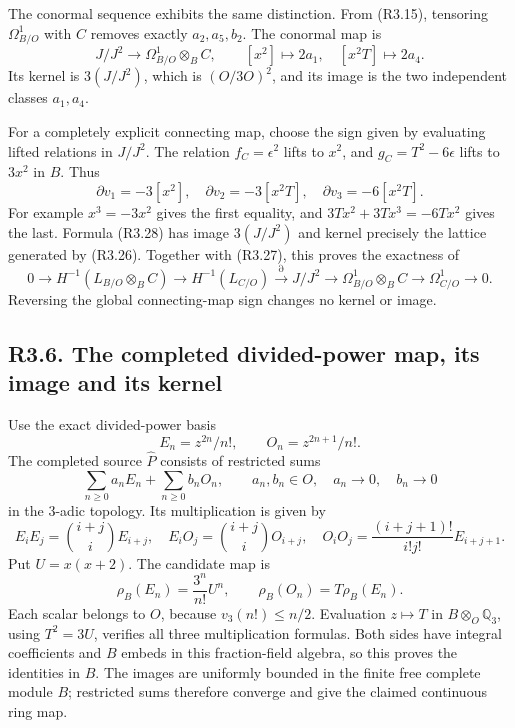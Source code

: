 \documentclass[
]{article}
\begin{document}
The conormal sequence exhibits the same distinction. From (R3.15),
tensoring \(\Omega^1_{B/O}\) with \(C\) removes exactly \(a_2,a_5,b_2\).
The conormal map is \[
J/J^2\longrightarrow\Omega^1_{B/O}\otimes_B C,\qquad
[x^2]\longmapsto2a_1,\quad[x^2T]\longmapsto2a_4.
\tag{R3.27}
\] Its kernel is \(3(J/J^2)\), which is \((O/3O)^2\), and its image is
the two independent classes \(a_1,a_4\).

For a completely explicit connecting map, choose the sign given by
evaluating lifted relations in \(J/J^2\). The relation
\(f_C=\epsilon^2\) lifts to \(x^2\), and \(g_C=T^2-6\epsilon\) lifts to
\(3x^2\) in \(B\). Thus \[
\partial v_1=-3[x^2],\quad
\partial v_2=-3[x^2T],\quad
\partial v_3=-6[x^2T].
\tag{R3.28}
\] For example \(x^3=-3x^2\) gives the first equality, and
\(3Tx^2+3Tx^3=-6Tx^2\) gives the last. Formula (R3.28) has image
\(3(J/J^2)\) and kernel precisely the lattice generated by (R3.26).
Together with (R3.27), this proves the exactness of \[
0\longrightarrow H^{-1}(L_{B/O}\otimes_B C)
\longrightarrow H^{-1}(L_{C/O})
\xrightarrow{\partial}J/J^2
\longrightarrow\Omega^1_{B/O}\otimes_B C
\longrightarrow\Omega^1_{C/O}\longrightarrow0.
\tag{R3.29}
\] Reversing the global connecting-map sign changes no kernel or image.

\subsection{R3.6. The completed divided-power map, its image and its
kernel}\label{r3.6.-the-completed-divided-power-map-its-image-and-its-kernel}

Use the exact divided-power basis \[
E_n=z^{2n}/n!,\qquad O_n=z^{2n+1}/n!.
\] The completed source \(\widehat P\) consists of restricted sums \[
\sum_{n\ge0}a_nE_n+\sum_{n\ge0}b_nO_n,\qquad
a_n,b_n\in O,\quad a_n\to0,\quad b_n\to0
\] in the 3-adic topology. Its multiplication is given by \[
E_iE_j=\binom{i+j}{i}E_{i+j},\quad
E_iO_j=\binom{i+j}{i}O_{i+j},\quad
O_iO_j=\frac{(i+j+1)!}{i!j!}E_{i+j+1}.
\tag{R3.30}
\] Put \(U=x(x+2)\). The candidate map is \[
\rho_B(E_n)=\frac{3^n}{n!}U^n,\qquad
\rho_B(O_n)=T\rho_B(E_n).
\tag{R3.31}
\] Each scalar belongs to \(O\), because \(v_3(n!)\le n/2\). Evaluation
\(z\mapsto T\) in \(B\otimes_O\mathbb Q_3\), using \(T^2=3U\), verifies
all three multiplication formulas. Both sides have integral coefficients
and \(B\) embeds in this fraction-field algebra, so this proves the
identities in \(B\). The images are uniformly bounded in the finite free
complete module \(B\); restricted sums therefore converge and give the
claimed continuous ring map.
\end{document}
